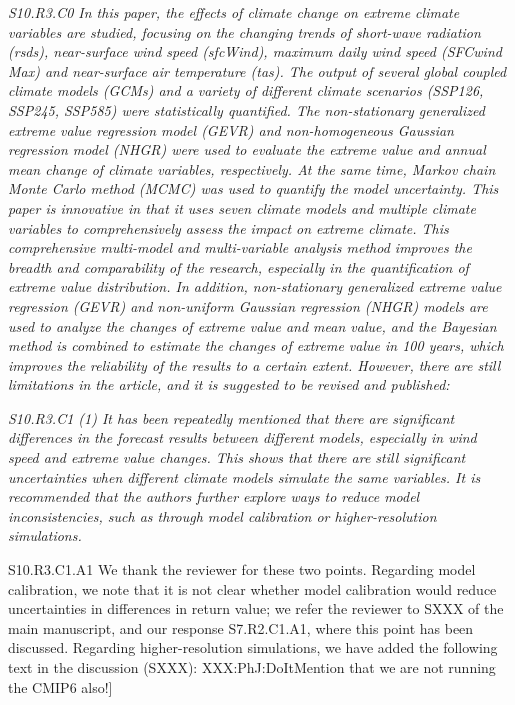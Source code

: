\documentclass[a4paper,10pt]{article}
\begin{document}
	\emph{S10.R3.C0 In this paper, the effects of climate change on extreme climate variables are studied, focusing on the changing trends of short-wave radiation (rsds), near-surface wind speed (sfcWind), maximum daily wind speed (SFCwind Max) and near-surface air temperature (tas). The output of several global coupled climate models (GCMs) and a variety of different climate scenarios (SSP126, SSP245, SSP585) were statistically quantified. The non-stationary generalized extreme value regression model (GEVR) and non-homogeneous Gaussian regression model (NHGR) were used to evaluate the extreme value and annual mean change of climate variables, respectively. At the same time, Markov chain Monte Carlo method (MCMC) was used to quantify the model uncertainty. This paper is innovative in that it uses seven climate models and multiple climate variables to comprehensively assess the impact on extreme climate. This comprehensive multi-model and multi-variable analysis method improves the breadth and comparability of the research, especially in the quantification of extreme value distribution. In addition, non-stationary generalized extreme value regression (GEVR) and non-uniform Gaussian regression (NHGR) models are used to analyze the changes of extreme value and mean value, and the Bayesian method is combined to estimate the changes of extreme value in 100 years, which improves the reliability of the results to a certain extent. However, there are still limitations in the article, and it is suggested to be revised and published:}

	\emph{S10.R3.C1 (1) It has been repeatedly mentioned that there are significant differences in the forecast results between different models, especially in wind speed and extreme value changes. This shows that there are still significant uncertainties when different climate models simulate the same variables. It is recommended that the authors further explore ways to reduce model inconsistencies, such as through model calibration or higher-resolution simulations.}

	S10.R3.C1.A1 We thank the reviewer for these two points. Regarding model calibration, we note that it is not clear whether model calibration would reduce uncertainties in differences in return value; we refer the reviewer to SXXX of the main manuscript, and our response S7.R2.C1.A1, where this point has been discussed. Regarding higher-resolution simulations, we have added the following text in the discussion (SXXX): XXX:PhJ:DoIt{Mention that we are not running the CMIP6 also!]}
\end{document}
